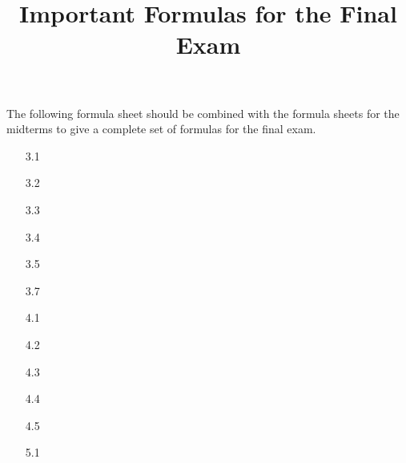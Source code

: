 \documentclass{article}
\title{Important Formulas for the Final Exam}
\author{\commonAuthor}
\date{\commonDateFinal}
\begin{document}
\maketitle

\noindent
The following formula sheet should be combined with the formula sheets
for the midterms to give a complete set of formulas for the final exam.

\begin{itemize}
\item[3.1] %
\item[3.2] %
\item[3.3] %
\item[3.4] %
\item[3.5] %
\item[3.7] %
\item[4.1] %
\item[4.2] %
\item[4.3] %
\item[4.4] %
\item[4.5] %
\item[5.1] %
\end{itemize}
\end{document}

